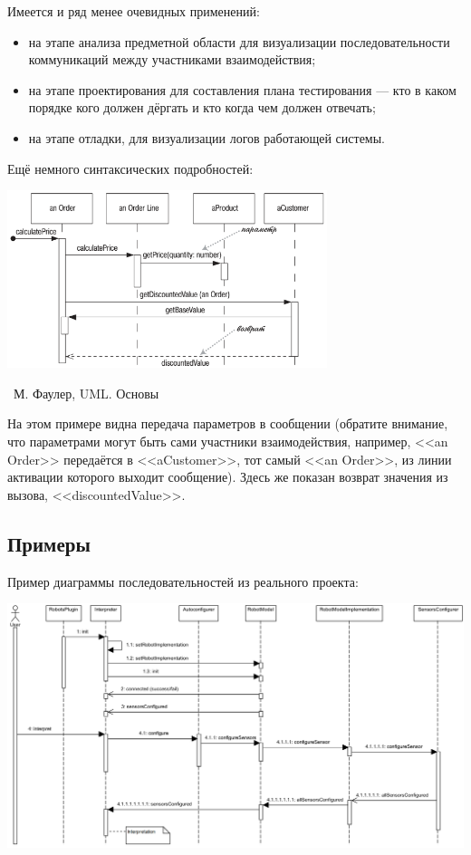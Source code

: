 \documentclass[a5paper]{article}
\newcommand{\attribution}[1] {
	\vspace{-5mm}\begin{flushright}\begin{scriptsize}%
	{\textcopyright\, #1}\end{scriptsize}\end{flushright}
}
\begin{document}
Имеется и ряд менее очевидных применений: 

\begin{itemize}
	\item на этапе анализа предметной области для визуализации последовательности коммуникаций между участниками взаимодействия;
	\item на этапе проектирования для составления плана тестирования --- кто в каком порядке кого должен дёргать и кто когда чем должен отвечать;
	\item на этапе отладки, для визуализации логов работающей системы.
\end{itemize}

Ещё немного синтаксических подробностей:

\begin{center}
	\includegraphics[width=0.7\textwidth]{sequenceDiagramSyntax2.png}
	\attribution{М. Фаулер, UML. Основы}
\end{center}

На этом примере видна передача параметров в сообщении (обратите внимание, что параметрами могут быть сами участники взаимодействия, например, <<an Order>> передаётся в <<aCustomer>>, тот самый <<an Order>>, из линии активации которого выходит сообщение). Здесь же показан возврат значения из вызова, <<discountedValue>>.

\subsection{Примеры}

Пример диаграммы последовательностей из реального проекта:

\begin{center}
	\includegraphics[width=\textwidth]{sequenceDiagramExample.png}
\end{center}
\end{document}
